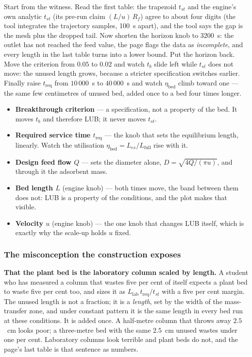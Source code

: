 \documentclass[11pt,a4paper]{article}
\begin{document}
\begin{tryit}
Start from the witness.  Read the first table: the trapezoid $t_{st}$ and
the engine's own analytic $t_{st}$ (its pre-run claim
$(L/u)\,R_f$) agree to about four digits (the tool integrates the trajectory samples, 100~s apart), and the tool says the gap is
the mesh plus the dropped tail.  Now shorten the horizon knob to
$3200$~s: the outlet has not reached the feed value, the page flags the
data as \emph{incomplete}, and every length in the last table turns into
a lower bound.  Put the horizon back.  Move the criterion from $0.05$ to
$0.02$ and watch $t_b$ slide left while $t_{st}$ does not move: the
unused length grows, because a stricter specification switches earlier.
Finally raise $t_{\mathrm{req}}$ from $10\,000$~s to $40\,000$~s and
watch $\eta_{\mathrm{bed}}$ climb toward one --- the same few centimetres
of unused bed, added once to a bed four times longer.
\end{tryit}

\begin{itemize}[leftmargin=*,nosep]
  \item \textbf{Breakthrough criterion} --- a specification, not a property
        of the bed.  It moves $t_b$ and therefore LUB; it never moves
        $t_{st}$.
  \item \textbf{Required service time $t_{\mathrm{req}}$} --- the knob that
        sets the equilibrium length, linearly.  Watch the utilisation
        $\eta_{\mathrm{bed}} = L_{es}/L_{\mathrm{full}}$ rise with it.
  \item \textbf{Design feed flow $Q$} --- sets the diameter alone,
        $D = \sqrt{4Q/(\pi u)}$, and through it the adsorbent mass.
  \item \textbf{Bed length $L$} (engine knob) --- both times move, the band
        between them does not: LUB is a property of the conditions, and the
        plot makes that visible.
  \item \textbf{Velocity $u$} (engine knob) --- the one knob that changes
        LUB itself, which is exactly why the scale-up holds $u$ fixed.
\end{itemize}

\subsubsection*{The misconception the construction exposes}

\begin{pitfall}
\textbf{That the plant bed is the laboratory column scaled by length.}  A
student who has measured a column that wastes five per cent of itself
expects a plant bed to waste five per cent too, and sizes it as
$L_{\mathrm{lab}}\,t_{\mathrm{req}}/t_{st}$ with a five per cent margin.
The unused length is not a fraction; it is a \emph{length}, set by the
width of the mass-transfer zone, and under constant pattern it is the same
length in every bed run at these conditions.  It is added once.  A
half-metre column that throws away $2.5$~cm looks poor; a three-metre bed
with the same $2.5$~cm unused wastes under one per cent.  Laboratory
columns look terrible and plant beds do not, and the page's last table is
that sentence as numbers.
\end{pitfall}
\end{document}
